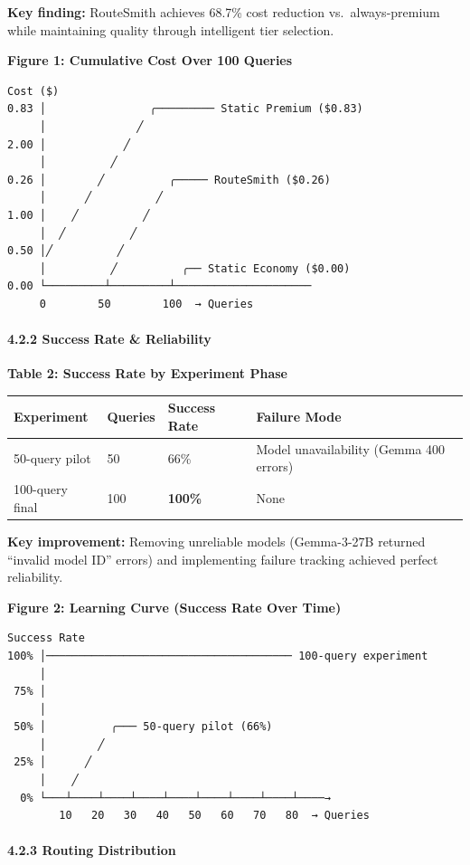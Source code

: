 \documentclass[
]{article}
\begin{document}
\textbf{Key finding:} RouteSmith achieves 68.7\% cost reduction
vs.~always-premium while maintaining quality through intelligent tier
selection.

\textbf{Figure 1: Cumulative Cost Over 100 Queries}

\begin{verbatim}
Cost ($)
0.83 │                ╭───────── Static Premium ($0.83)
     │              ╱
2.00 │            ╱
     │          ╱
0.26 │        ╱          ╭───── RouteSmith ($0.26)
     │      ╱          ╱
1.00 │    ╱          ╱
     │  ╱          ╱
0.50 │╱          ╱
     │          ╱          ╭── Static Economy ($0.00)
0.00 └─────────┴─────────┴─────────────────────
     0        50        100  → Queries
\end{verbatim}

\hypertarget{success-rate-reliability}{%
\paragraph{4.2.2 Success Rate \&
Reliability}\label{success-rate-reliability}}

\textbf{Table 2: Success Rate by Experiment Phase}

\begin{longtable}[]{@{}llll@{}}
\toprule
Experiment & Queries & Success Rate & Failure Mode \\
\midrule
\endhead
50-query pilot & 50 & 66\% & Model unavailability (Gemma 400 errors) \\
100-query final & 100 & \textbf{100\%} & None \\
\bottomrule
\end{longtable}

\textbf{Key improvement:} Removing unreliable models (Gemma-3-27B
returned ``invalid model ID'' errors) and implementing failure tracking
achieved perfect reliability.

\textbf{Figure 2: Learning Curve (Success Rate Over Time)}

\begin{verbatim}
Success Rate
100% │────────────────────────────────────── 100-query experiment
     │
 75% │
     │
 50% │          ╭─── 50-query pilot (66%)
     │        ╱
 25% │      ╱
     │    ╱
  0% └───┴────┴────┴────┴────┴────┴────┴────┴────→
        10   20   30   40   50   60   70   80  → Queries
\end{verbatim}

\hypertarget{routing-distribution-1}{%
\paragraph{4.2.3 Routing Distribution}\label{routing-distribution-1}}
\end{document}

